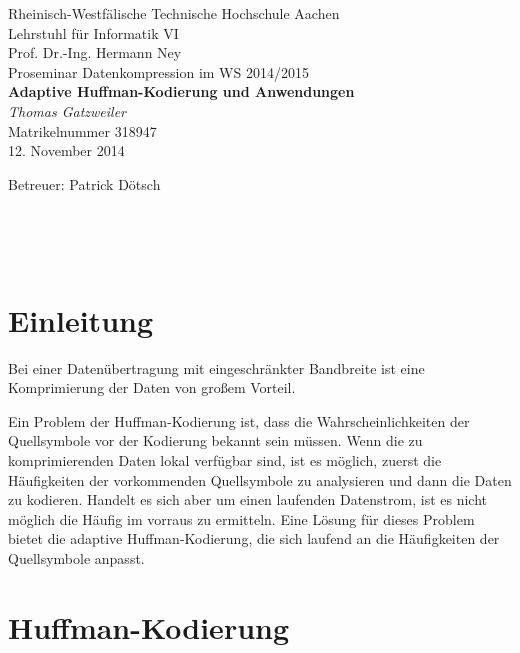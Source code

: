 \documentclass[twoside,11pt,a4paper]{article}
\theoremstyle{break}
\begin{document}
\pagestyle{empty}
\begin{center}

    Rheinisch-Westfälische Technische Hochschule Aachen \\
    Lehrstuhl für Informatik VI \\
    Prof. Dr.-Ing. Hermann Ney\\[6ex]
    Proseminar Datenkompression im WS 2014/2015\\[12ex]

    \LARGE
    \textbf{Adaptive Huffman-Kodierung und Anwendungen} \\[6ex]
    \textit{Thomas Gatzweiler} \\[6ex]
    \Large
    Matrikelnummer 318947 \\[6ex]
    12. November 2014

    \vfill
    \Large Betreuer: Patrick Dötsch
\end{center}

\newpage
\
\newpage

\pagestyle{headings}
\tableofcontents
\listoftables
\listoffigures
\newpage
\pagestyle{empty}
\
\newpage
\pagestyle{headings}


\setlength{\parindent}{0pt}
\setlength{\parskip}{2ex plus 0.5ex minus 0.2ex}


\section{Einleitung}
Bei einer Datenübertragung mit eingeschränkter Bandbreite ist eine
Komprimierung der Daten von großem Vorteil.

Ein Problem der Huffman-Kodierung ist, dass die Wahrscheinlichkeiten
der Quellsymbole vor der Kodierung bekannt sein müssen. Wenn die zu
komprimierenden Daten lokal verfügbar sind, ist es möglich, zuerst die
Häufigkeiten der vorkommenden Quellsymbole zu analysieren und dann
die Daten zu kodieren. Handelt es sich aber um einen laufenden
Datenstrom, ist es nicht möglich die Häufig im vorraus zu ermitteln.
Eine Lösung für dieses Problem bietet die adaptive Huffman-Kodierung,
die sich laufend an die Häufigkeiten der Quellsymbole anpasst.

\section{Huffman-Kodierung}
\end{document}
